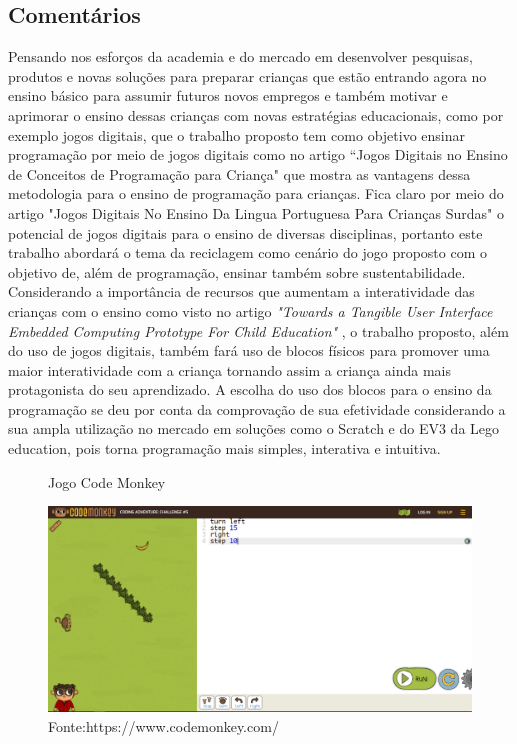 \subsection{Comentários}
Pensando nos esforços da academia e do mercado em desenvolver pesquisas, produtos e novas soluções para preparar crianças que estão entrando agora no ensino básico para assumir futuros novos empregos e também motivar e aprimorar o ensino dessas crianças com novas estratégias educacionais, como  por exemplo jogos digitais, que o trabalho proposto tem como objetivo ensinar programação por meio de jogos digitais como no artigo “Jogos Digitais no Ensino de Conceitos de Programação para Criança" \cite{tadesco_2016} que mostra as vantagens dessa metodologia para o ensino de programação para crianças. Fica claro por meio do artigo "Jogos Digitais No Ensino Da Lingua Portuguesa Para Crianças Surdas" \cite{liz_2017} o potencial de jogos digitais para o ensino de diversas disciplinas, portanto este trabalho abordará o tema da reciclagem como cenário do jogo proposto com o objetivo de, além de programação, ensinar também sobre sustentabilidade. Considerando a importância de recursos que aumentam a interatividade das crianças com o ensino como visto no artigo \textit{"Towards a Tangible User Interface Embedded Computing Prototype For Child Education"} \cite{carneiro_2018}, o trabalho proposto, além do uso de jogos digitais, também fará uso de blocos físicos para promover uma maior interatividade com a criança tornando assim a criança ainda mais protagonista do seu aprendizado. A escolha do uso dos blocos para o ensino da programação se deu por conta da comprovação de sua efetividade considerando a sua ampla utilização no mercado em soluções como o Scratch e do EV3 da Lego education, pois torna programação mais simples, interativa e intuitiva. 

\captionsetup{justification=centering}

\begin{figure}[h!]
    \centering
    \caption{Jogo Code Monkey}
    \includegraphics[width=15cm]{images/cap2/code_monkey.png}
    \caption*{Fonte:https://www.codemonkey.com/}
    \label{figura:code_monkey}
\end{figure}

